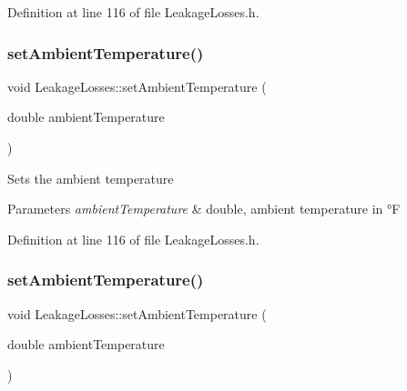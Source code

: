 Definition at line 116 of file Leakage\+Losses.\+h.

\mbox{\label{class_leakage_losses_aa6028111b3eb305d9ea6f9efea7c6c66}} 
\subsubsection{\texorpdfstring{set\+Ambient\+Temperature()}{setAmbientTemperature()}\hspace{0.1cm}{\footnotesize\ttfamily [2/3]}}
{\footnotesize\ttfamily void Leakage\+Losses\+::set\+Ambient\+Temperature (\begin{DoxyParamCaption}\item[{double}]{ambient\+Temperature }\end{DoxyParamCaption})\hspace{0.3cm}{\ttfamily [inline]}}

Sets the ambient temperature 
\begin{DoxyParams}{Parameters}
{\em ambient\+Temperature} & double, ambient temperature in °F \\
\hline
\end{DoxyParams}


Definition at line 116 of file Leakage\+Losses.\+h.

\mbox{\label{class_leakage_losses_aa6028111b3eb305d9ea6f9efea7c6c66}} 
\subsubsection{\texorpdfstring{set\+Ambient\+Temperature()}{setAmbientTemperature()}\hspace{0.1cm}{\footnotesize\ttfamily [3/3]}}
{\footnotesize\ttfamily void Leakage\+Losses\+::set\+Ambient\+Temperature (\begin{DoxyParamCaption}\item[{double}]{ambient\+Temperature }\end{DoxyParamCaption})\hspace{0.3cm}{\ttfamily [inline]}}

